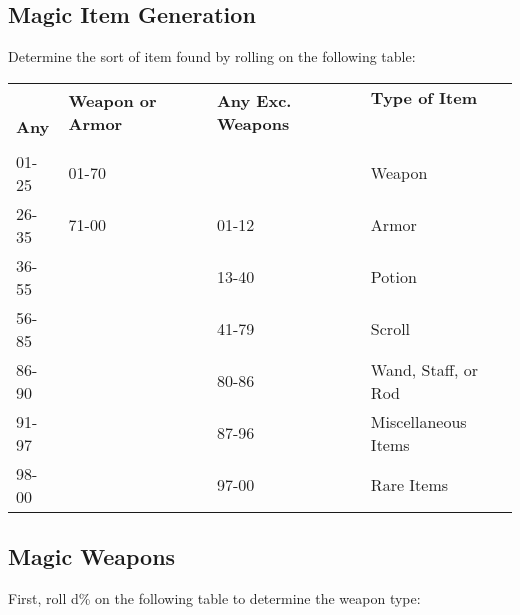 \documentclass[a4paper,twoside,openany,10pt]{book}
\begin{document}
\pagebreak

\subsection{Magic Item Generation}\label{magic-item-generation}

\begin{multicols}{2}

Determine the sort of item found by rolling on the following table:\medskip

\begin{tabularx}{0.45\textwidth}{@{}lXXl@{}}
&\multirow{2}{4em}{\textbf{Weapon or Armor}}&\multirow{2}{4em}{\textbf{Any Exc.  Weapons}}&\textbf{Type of Item}\\
\textbf{Any}&&&\\
&&&\\\toprule
01-25 & 01-70 & & Weapon \\\hline
26-35 & 71-00 & 01-12 & Armor \\\hline
36-55 & & 13-40 & Potion \\\hline
56-85 & & 41-79 & Scroll \\\hline
86-90 & & 80-86 & Wand, Staff, or Rod \\\hline
91-97 & & 87-96 & Miscellaneous Items \\\hline
98-00 & & 97-00 & Rare Items \\\bottomrule
\end{tabularx}

\subsection{Magic Weapons}\label{magic-weapons}

First, roll d\% on the following table to determine the weapon type:


\end{multicols}
\end{document}

